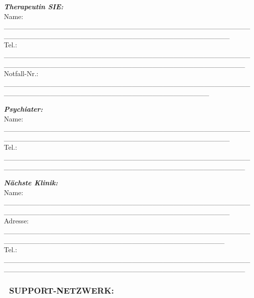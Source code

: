 \emph{\textbf{Therapeutin SIE:}}\\
Name: \_\_\_\_\_\_\_\_\_\_\_\_\_\_\_\_\_\_\_\_\_\_\_\_\_\_\_\_\_\_\_\_\_\_\_\_\_\_\_\_\_\_\_\_\_\_\_\_\_\_\_\_\_\_\_\_\_\_\_\_\_\_\_\_\_\_\_\_\_\_\_\_\_\_\_\_\_\_\_\_\_\_\_\_\_\_\_\_\_\_\_\_\\
Tel.: \_\_\_\_\_\_\_\_\_\_\_\_\_\_\_\_\_\_\_\_\_\_\_\_\_\_\_\_\_\_\_\_\_\_\_\_\_\_\_\_\_\_\_\_\_\_\_\_\_\_\_\_\_\_\_\_\_\_\_\_\_\_\_\_\_\_\_\_\_\_\_\_\_\_\_\_\_\_\_\_\_\_\_\_\_\_\_\_\_\_\_\_\_\_\_\\
Notfall-Nr.: \_\_\_\_\_\_\_\_\_\_\_\_\_\_\_\_\_\_\_\_\_\_\_\_\_\_\_\_\_\_\_\_\_\_\_\_\_\_\_\_\_\_\_\_\_\_\_\_\_\_\_\_\_\_\_\_\_\_\_\_\_\_\_\_\_\_\_\_\_\_\_\_\_\_\_\_\_\_\_\_\_\_\_\_\_\_\_\_

\emph{\textbf{Psychiater:}}\\
Name: \_\_\_\_\_\_\_\_\_\_\_\_\_\_\_\_\_\_\_\_\_\_\_\_\_\_\_\_\_\_\_\_\_\_\_\_\_\_\_\_\_\_\_\_\_\_\_\_\_\_\_\_\_\_\_\_\_\_\_\_\_\_\_\_\_\_\_\_\_\_\_\_\_\_\_\_\_\_\_\_\_\_\_\_\_\_\_\_\_\_\_\_\\
Tel.: \_\_\_\_\_\_\_\_\_\_\_\_\_\_\_\_\_\_\_\_\_\_\_\_\_\_\_\_\_\_\_\_\_\_\_\_\_\_\_\_\_\_\_\_\_\_\_\_\_\_\_\_\_\_\_\_\_\_\_\_\_\_\_\_\_\_\_\_\_\_\_\_\_\_\_\_\_\_\_\_\_\_\_\_\_\_\_\_\_\_\_\_\_\_\_

\emph{\textbf{Nächste Klinik:}}\\
Name: \_\_\_\_\_\_\_\_\_\_\_\_\_\_\_\_\_\_\_\_\_\_\_\_\_\_\_\_\_\_\_\_\_\_\_\_\_\_\_\_\_\_\_\_\_\_\_\_\_\_\_\_\_\_\_\_\_\_\_\_\_\_\_\_\_\_\_\_\_\_\_\_\_\_\_\_\_\_\_\_\_\_\_\_\_\_\_\_\_\_\_\_\\
Adresse: \_\_\_\_\_\_\_\_\_\_\_\_\_\_\_\_\_\_\_\_\_\_\_\_\_\_\_\_\_\_\_\_\_\_\_\_\_\_\_\_\_\_\_\_\_\_\_\_\_\_\_\_\_\_\_\_\_\_\_\_\_\_\_\_\_\_\_\_\_\_\_\_\_\_\_\_\_\_\_\_\_\_\_\_\_\_\_\_\_\_\_\\
Tel.: \_\_\_\_\_\_\_\_\_\_\_\_\_\_\_\_\_\_\_\_\_\_\_\_\_\_\_\_\_\_\_\_\_\_\_\_\_\_\_\_\_\_\_\_\_\_\_\_\_\_\_\_\_\_\_\_\_\_\_\_\_\_\_\_\_\_\_\_\_\_\_\_\_\_\_\_\_\_\_\_\_\_\_\_\_\_\_\_\_\_\_\_\_\_\_

\hypertarget{support-netzwerk-1}{%
\subsubsection{\texorpdfstring{\textbf{👥 SUPPORT-NETZWERK:}}{👥 SUPPORT-NETZWERK:}}\label{support-netzwerk-1}}

